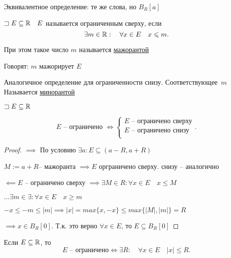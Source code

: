     \begin{note}
        Эквивалентное определение: те же слова, но $B_R[a]$
    \end{note}

    \begin{definition}
        $\sqsupset  E \subseteq \mathbb{R}\quad E$ называется ограниченным сверху, если \[
        \exists m\in \mathbb{R}:\quad \forall x\in E\quad x\leqslant m
        .\] 

        При этом такое число $m$ называется \underline{мажорантой}

        Говорят: $m$ мажорирует $E$


        Аналогичное определение для ограниченности снизу. 
        Соответствующее~$m$ Называется \underline{минорантой}
    \end{definition}

    \begin{statement}
        $\sqsupset E\subseteq \mathbb{R}$

        \[
        E \text{ -- ограничено } \iff  \begin{cases}
            E \text{ --  ограничено сверху}\\
            E \text{ -- ограничено снизу}\\
        \end{cases}
        .\] 
    \end{statement}
    \begin{proof}
        $\implies $ По условию $\exists a: E\subseteq (a-R, a+R)$

        $M:=a+R$-- мажоранта $\implies E$ орграничено сверху. снизу -- аналогично    

        $\impliedby E$ -- ограничено сверху $\implies \exists M\in R: \forall x\in E\quad x\leqslant M$

        $\ldots \exists m\in \exists : \forall x\in E\quad x\geqslant m$

        $-x\leqslant -m \leqslant |m| \implies  |x| = max\{x, -x\}\leqslant max\{|M|, |m|\} = R$

        $\implies  x\in B_R[0]$. Т.к. это верно $\forall x\in E$, то $E \subseteq  B_R[0]$
    \end{proof}

    \begin{note}
        Если $E\subseteq \mathbb{R}$, то \[
            E \text{ -- ограничено} \iff  \exists R:\quad \forall x\in E\quad |x|\leqslant R
        .\] 
    \end{note}

